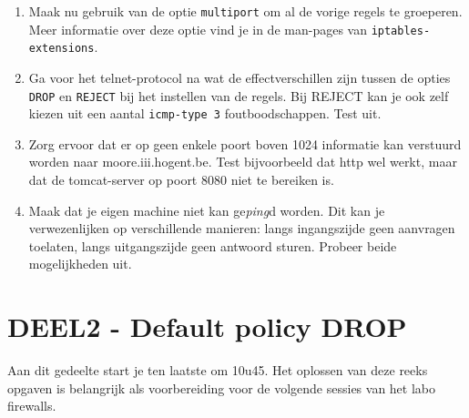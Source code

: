 \documentclass{report}
\begin{document}
\begin{enumerate}
	\item     Maak nu gebruik van de optie \texttt{multiport} om al de vorige regels te groeperen. Meer informatie over deze optie vind je in de man-pages van \texttt{iptables-extensions}.

	\item     Ga voor het telnet-protocol na wat de effectverschillen zijn tussen de opties \texttt{DROP} en \texttt{REJECT} bij het instellen van de regels.
    Bij REJECT kan je ook zelf kiezen uit een aantal \texttt{icmp-type 3} foutboodschappen. Test uit.

	\item     Zorg ervoor dat er op geen enkele poort boven 1024 informatie kan verstuurd worden naar moore.iii.hogent.be.
    Test bijvoorbeeld dat http wel werkt, maar dat de tomcat-server op poort 8080 niet te bereiken is.

	\item     Maak dat je eigen machine niet kan ge\emph{ping}d worden. Dit kan je verwezenlijken op verschillende manieren: langs ingangszijde geen aanvragen toelaten, langs uitgangszijde geen antwoord sturen. Probeer beide mogelijkheden uit.

\end{enumerate}


\section{DEEL2 - Default policy DROP}

Aan dit gedeelte start je ten laatste om 10u45. Het oplossen van deze reeks opgaven is belangrijk als voorbereiding voor de volgende sessies van het labo firewalls.
\end{document}
